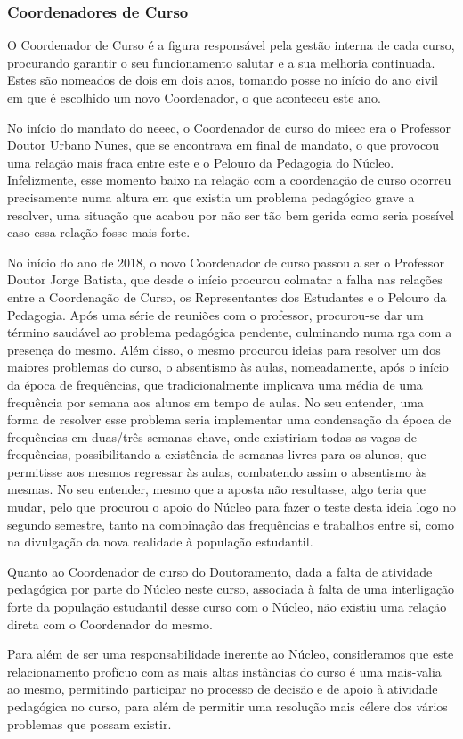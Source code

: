 
\subsubsection{Coordenadores de Curso}

O Coordenador de Curso é a figura responsável pela gestão interna de cada curso, procurando garantir o seu funcionamento salutar e a sua melhoria continuada. Estes são nomeados de dois em dois anos, tomando posse no início do ano civil em que é escolhido um novo Coordenador, o que aconteceu este ano.

No início do mandato do \acrshort{neeec}, o Coordenador de curso do \acrfull{mieec} era o Professor Doutor Urbano Nunes, que se encontrava em final de mandato, o que provocou uma relação mais fraca entre este e o Pelouro da Pedagogia do Núcleo. Infelizmente, esse momento baixo na relação com a coordenação de curso ocorreu precisamente numa altura em que existia um problema pedagógico grave a resolver, uma situação que acabou por não ser tão bem gerida como seria possível caso essa relação fosse mais forte.

No início do ano de 2018, o novo Coordenador de curso passou a ser o Professor Doutor Jorge Batista, que desde o início procurou colmatar a falha nas relações entre a Coordenação de Curso, os Representantes dos Estudantes e o Pelouro da Pedagogia. Após uma série de reuniões com o professor, procurou-se dar um término saudável ao problema pedagógica pendente, culminando numa \acrfull{rga} com a presença do mesmo. Além disso, o mesmo procurou ideias para resolver um dos maiores problemas do curso, o absentismo às aulas, nomeadamente, após o início da época de frequências, que tradicionalmente implicava uma média de uma frequência por semana aos alunos em tempo de aulas. No seu entender, uma forma de resolver esse problema seria implementar uma condensação da época de frequências em duas/três semanas chave, onde existiriam todas as vagas de frequências, possibilitando a existência de semanas livres para os alunos, que permitisse aos mesmos regressar às aulas, combatendo assim o absentismo às mesmas. No seu entender, mesmo que a aposta não resultasse, algo teria que mudar, pelo que procurou o apoio do Núcleo para fazer o teste desta ideia logo no segundo semestre, tanto na combinação das frequências e trabalhos entre si, como na divulgação da nova realidade à população estudantil.

Quanto ao Coordenador de curso do Doutoramento, dada a falta de atividade pedagógica por parte do Núcleo neste curso, associada à falta de uma interligação forte da população estudantil desse curso com o Núcleo, não existiu uma relação direta com o Coordenador do mesmo.

Para além de ser uma responsabilidade inerente ao Núcleo, consideramos que este relacionamento profícuo com as mais altas instâncias do curso é uma mais-valia ao mesmo, permitindo participar no processo de decisão e de apoio à atividade pedagógica no curso, para além de permitir uma resolução mais célere dos vários problemas que possam existir.